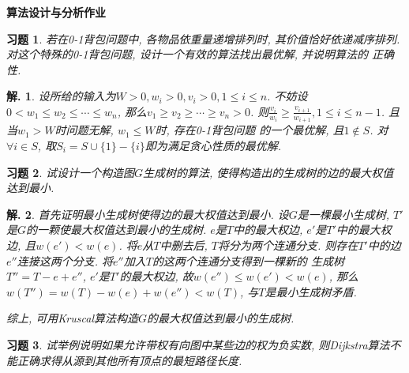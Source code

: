 \documentclass[a4paper,oneside,12pt]{ctexart}
\theoremstyle{plain}
\newtheorem{exercise}{习题}
\theoremstyle{nonumberplain}
\newtheorem{solution}{解.}
\theoremstyle{nonumberplain}
\begin{document}
    \begin{center}
        \bfseries\LARGE
        算法设计与分析作业
    \end{center}

    \begin{exercise}
        \label{ex:4.3}
        若在0-1背包问题中, 各物品依重量递增排列时, 其价值恰好依递减序排列. 对这个特殊的0-1背包问题, 设计一个有效的算法找出最优解, 并说明算法的
        正确性.
    \end{exercise}

    \begin{solution}
        设所给的输入为$W>0,w_i>0,v_i>0,1\leqslant i\leqslant n$. 不妨设$0<w_1\leqslant w_2\leqslant \cdots\leqslant w_n$, 那么$v_1\geqslant v_2\geqslant \cdots\geqslant v_n>0$. 
        则$\frac{v_i}{w_i}\geqslant \frac{v_{i+1}}{w_{i+1}},1\leqslant i\leqslant n-1$. 且当$w_1>W$时问题无解, $w_1\leqslant W$时, 存在0-1背包问题
        的一个最优解, 且$1\notin S$. 对$\forall i\in S$, 取$S_i=S\cup\{1\}-\{i\}$即为满足贪心性质的最优解.
    \end{solution}

    \begin{exercise}
        \label{ex:4.12}
        试设计一个构造图$G$生成树的算法, 使得构造出的生成树的边的最大权值达到最小.
    \end{exercise}

    \begin{solution}
        首先证明最小生成树使得边的最大权值达到最小. 设$G$是一棵最小生成树, $T'$是$G$的一颗使最大权值达到最小的生成树. $e$是$T$中的最大权边, $e'$是$T'$中的最大权边, 
        且$w(e')<w(e)$. 将$e$从$T$中删去后, $T$将分为两个连通分支. 则存在$T'$中的边$e''$连接这两个分支. 将$e''$加入$T$的这两个连通分支得到一棵新的
        生成树$T''=T-e+e''$, $e'$是$T'$的最大权边, 故$w(e'')\leqslant w(e')<w(e)$, 那么$w(T'')=w(T)-w(e)+w(e'')<w(T)$, 与$T$是最小生成树矛盾. 

        综上, 可用Kruscal算法构造$G$的最大权值达到最小的生成树.
    \end{solution}

    \begin{exercise}
        \label{ex:4.13}
        试举例说明如果允许带权有向图中某些边的权为负实数, 则Dijkstra算法不能正确求得从源到其他所有顶点的最短路径长度.
    \end{exercise}
\end{document}
